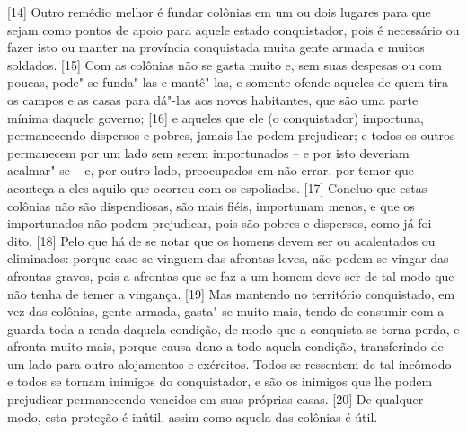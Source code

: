 {[}14{]} Outro remédio melhor é fundar colônias em um ou dois lugares
para que sejam como pontos de apoio para aquele estado conquistador,
pois é necessário ou fazer isto ou manter na província conquistada muita
gente armada e muitos soldados. {[}15{]} Com as colônias não se gasta
muito e, sem suas despesas ou com poucas, pode"-se funda"-las e mantê"-las,
e somente ofende aqueles de quem tira os campos e as casas para dá"-las
aos novos habitantes, que são uma parte mínima daquele governo; {[}16{]}
e aqueles que ele (o conquistador) importuna, permanecendo dispersos e
pobres, jamais lhe podem prejudicar; e todos os outros permanecem por um
lado sem serem importunados -- e por isto deveriam acalmar"-se -- e, por
outro lado, preocupados em não errar, por temor que aconteça a eles
aquilo que ocorreu com os espoliados. {[}17{]} Concluo que estas
colônias não são dispendiosas, são mais fiéis, importunam menos, e que
os importunados não podem prejudicar, pois são pobres e dispersos, como
já foi dito. {[}18{]} Pelo que há de se notar que os homens devem ser ou
acalentados ou eliminados: porque caso se vinguem das afrontas leves,
não podem se vingar das afrontas graves, pois a afrontas que se faz a um
homem deve ser de tal modo que não tenha de temer a vingança. {[}19{]}
Mas mantendo no território conquistado, em vez das colônias, gente
armada, gasta"-se muito mais, tendo de consumir com a guarda toda a renda
daquela condição, de modo que a conquista se torna perda, e afronta
muito mais, porque causa dano a todo aquela condição, transferindo de um
lado para outro alojamentos e exércitos. Todos se ressentem de tal
incômodo e todos se tornam inimigos do conquistador, e são os inimigos
que lhe podem prejudicar permanecendo vencidos em suas próprias casas.
{[}20{]} De qualquer modo, esta proteção é inútil, assim como aquela das
colônias é útil.

